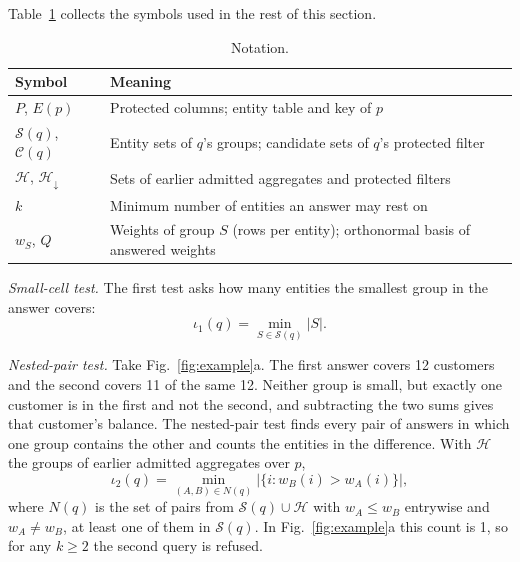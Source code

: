 \documentclass[sigconf,nonacm]{acmart}
\begin{document}
Table~\ref{tab:notation} collects the symbols used in the rest of this section.

\begin{table}[!t]
\caption{Notation.}
\label{tab:notation}
\centering\footnotesize
\begin{tabular}{@{}l@{\ \ }p{}@{}}
\toprule
Symbol & Meaning\\
\midrule
$P$, $E(p)$ & Protected columns; entity table and key of $p$\\
$\mathcal{S}(q)$, $\mathcal{C}(q)$ & Entity sets of $q$'s groups; candidate sets of $q$'s protected filter\\
$\mathcal{H}$, $\mathcal{H}_{\downarrow}$ & Sets of earlier admitted aggregates and protected filters\\
$k$ & Minimum number of entities an answer may rest on\\
$w_S$, $Q$ & Weights of group $S$ (rows per entity); orthonormal basis of answered weights\\
\bottomrule
\end{tabular}
\end{table}

\emph{Small-cell test.} The first test asks how many entities the smallest group in the answer covers:
\begin{equation}\label{eq:cell}
\iota_1(q)=\min_{S\in\mathcal{S}(q)}|S|.
\end{equation}

\emph{Nested-pair test.} Take Fig.~\ref{fig:example}a. The first answer covers 12 customers and the second covers 11 of the same 12. Neither group is small, but exactly one customer is in the first and not the second, and subtracting the two sums gives that customer's balance. The nested-pair test finds every pair of answers in which one group contains the other and counts the entities in the difference. With $\mathcal{H}$ the groups of earlier admitted aggregates over $p$,
\begin{equation}\label{eq:pair}
\iota_2(q)=\min_{(A,B)\in N(q)}\bigl|\{i: w_B(i)>w_A(i)\}\bigr|,
\end{equation}
where $N(q)$ is the set of pairs from $\mathcal{S}(q)\cup\mathcal{H}$ with $w_A\le w_B$ entrywise and $w_A\ne w_B$, at least one of them in $\mathcal{S}(q)$. In Fig.~\ref{fig:example}a this count is 1, so for any $k\ge2$ the second query is refused.
\end{document}
